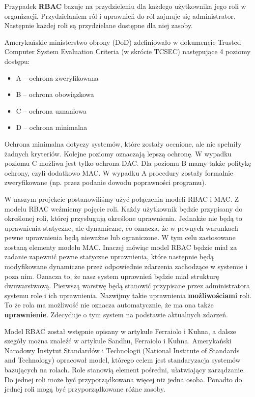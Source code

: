\documentclass{classrep}
\begin{document}
Przypadek \textbf{RBAC} bazuje na przydzieleniu dla każdego użytkownika jego roli w organizacji. Przydzielaniem ról i uprawnień do ról zajmuje się administrator. Następnie każdej roli
są przydzielane dostępne dla niej zasoby.

Amerykańskie ministerstwo obrony (DoD) zdefiniowało w dokumencie Trusted Computer System Evaluation Criteria\cite{tcsec} (w skrócie TCSEC) następujące 4 poziomy dostępu:
\begin{itemize}
\item A -- ochrona zweryfikowana
\item B -- ochrona obowiązkowa
\item C -- ochrona uznaniowa
\item D -- ochrona minimalna
\end{itemize}

Ochrona minimalna dotyczy systemów, które zostały ocenione, ale nie spełniły żadnych kryteriów. Kolejne poziomy oznaczają lepszą ochronę. W wypadku poziomu C możliwa jest
tylko ochrona DAC. Dla poziomu B mamy także politykę ochrony, czyli dodatkowo MAC. W wypadku A procedury zostały formalnie zweryfikowane (np. przez podanie dowodu poprawności programu).

W naszym projekcie postanowiliśmy użyć połączenia modeli RBAC i MAC. Z modelu RBAC weźmiemy pojęcie roli. Każdy użytkownik będzie przypisany do określonej roli, której przysługują
określone uprawnienia. Jednakże nie będą to uprawnienia statyczne, ale dynamiczne, co oznacza, że w pewnych warunkach pewne uprawnienia będą nieważne lub ograniczone.
W tym celu zastosowane zostaną elementy modelu MAC. Inaczej mówiąc model RBAC będzie miał za zadanie zapewnić pewne statyczne uprawnienia, które następnie będą modyfikowane dynamiczne
przez odpowiednie zdarzenia zachodzące w systemie i poza nim. Oznacza to, że nasz system uprawnień będzie miał strukturę dwuwarstwową. Pierwszą warstwę będą stanowić
przypisane przez administratora systemu role i ich uprawnienia. Nazwijmy takie uprawnienia \textbf{możliwościami} roli. To że rola ma możliwość nie oznacza automatycznie,
że ma ona także \textbf{uprawnienie}. Zdecyduje o tym system na podstawie aktualnych zdarzeń.

Model RBAC został wstępnie opisany w artykule Ferraiolo i Kuhna\cite{RBAC}, a dalsze szegóły można znaleźć w artykule Sandhu, Ferraiolo i Kuhna\cite{NistModel}.
Amerykański Narodowy Instytut Standardów i Technologii (National Institute of Standards and Technology) opracował model\cite{NIST}, którego celem jest standaryzacja systemów
bazujących na rolach. Role stanowią element pośredni, ułatwiający zarządzanie. Do jednej roli może być przyporządkowana więcej niż jedna osoba. Ponadto do jednej roli mogą być
przyporządkowane różne zasoby.
\end{document}
